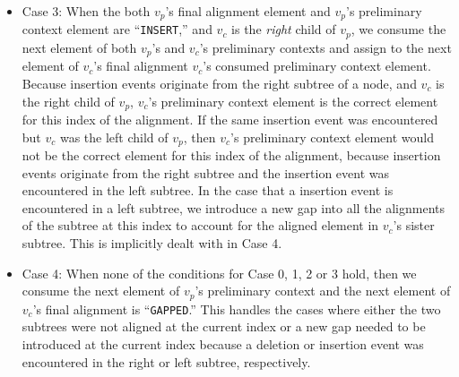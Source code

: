 \documentclass{bmcart}
\begin{document}
\begin{itemize}
  \item Case 3: When the both $v_p$'s final alignment element and $v_p$'s preliminary context element are ``\texttt{INSERT},'' and $v_c$ is the \textit{right} child of $v_p$, we consume the next element of both $v_p$'s and $v_c$'s preliminary contexts and assign to the next element of $v_c$'s final alignment $v_c$'s consumed preliminary context element.
  Because insertion events originate from the right subtree of a node, and $v_c$ is the right child of $v_p$, $v_c$'s preliminary context element is the correct element for this index of the alignment.
  If the same insertion event was encountered but $v_c$ was the left child of $v_p$, then $v_c$'s preliminary context element would not be the correct element for this index of the alignment, because insertion events originate from the right subtree and the insertion event was encountered in the left subtree.
  In the case that a insertion event is encountered in a left subtree, we introduce a new gap into all the alignments of the subtree at this index to account for the aligned element in $v_c$'s sister subtree.
  This is implicitly dealt with in Case 4.
  
  \item Case 4: When none of the conditions for Case 0, 1, 2 or 3 hold, then we consume the next element of $v_p$'s preliminary context and the next element of $v_c$'s final alignment is ``\texttt{GAPPED}.''
  This handles the cases where either the two subtrees were not aligned at the current index or a new gap needed to be introduced at the current index because a deletion or insertion event was encountered in the right or left subtree, respectively. 

\end{itemize}
\end{document}
